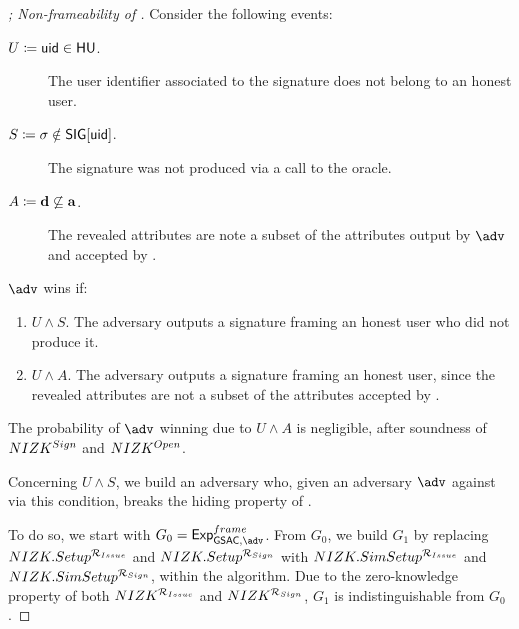 \begin{proof}[; Non-frameability of \GSACGen]
  Consider the following events:

  \begin{description}
  \item[$U \coloneqq \mathsf{uid} \in \mathsf{HU}$.] The user identifier associated to the
    signature does not belong to an honest user.
  \item[$S \coloneqq \sigma \notin \mathsf{SIG}\lbrack \mathsf{uid} \rbrack$.] The signature was
    not produced via a call to the \SIGN oracle.
  \item[$A \coloneqq \mathbf{d} \not\subseteq \mathbf{a}$.] The revealed attributes are
    note a subset of the attributes output by $\adv$ and accepted by \Judge.
  \end{description}

  $\adv$ wins if:

  \begin{enumerate}
  \item $U \land S$. The adversary outputs a signature framing an honest user
    who did not produce it.
  \item $U \land A$. The adversary outputs a signature framing an honest user,
    since the revealed attributes are not a subset of the attributes accepted
    by \Judge.
  \end{enumerate}

  The probability of $\adv$ winning due to $U \land A$ is negligible, after
  soundness of $NIZK^{Sign}$ and $NIZK^{Open}$.
  
  Concerning $U \land S$, we build an adversary \advB who, given an adversary
  $\adv$ against \ExpGSACNonframe via this condition, breaks the hiding property
  of \C.

  To do so, we start with $G_0=\ExpGSACNonframe$. From $G_0$, we build $G_1$
  by replacing $NIZK.Setup^{\mathcal{R}_{Issue}}$ and  $NIZK.Setup^{\mathcal{R}_{Sign}}$
  with $NIZK.SimSetup^{\mathcal{R}_{Issue}}$ and $NIZK.SimSetup^{\mathcal{R}_{Sign}}$,
  within the \Setup algorithm. Due to the zero-knowledge property of both
  $NIZK^{\mathcal{R}_{Issue}}$ and $NIZK^{\mathcal{R}_{Sign}}$, $G_1$ is
  indistinguishable from $G_0$.


\end{proof}
